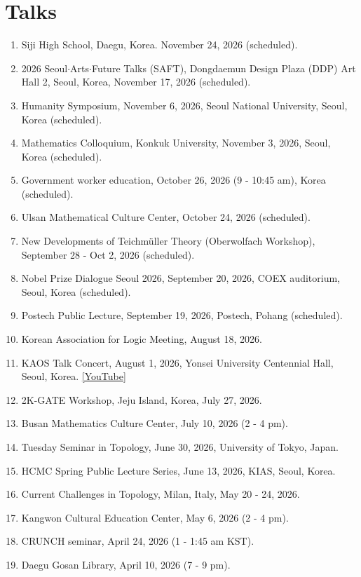 \documentclass[11pt,a4paper]{article}
\begin{document}
\section*{Talks}
\begin{enumerate}[leftmargin=1.5em, label=\arabic*.]
\item Siji High School, Daegu, Korea. November 24, 2026 (scheduled).
\item 2026 Seoul$\cdot$Arts$\cdot$Future Talks (SAFT), Dongdaemun Design Plaza (DDP) Art Hall 2, Seoul, Korea, November 17, 2026 (scheduled).
\item Humanity Symposium, November 6, 2026, Seoul National University, Seoul, Korea (scheduled).
\item Mathematics Colloquium, Konkuk University, November 3, 2026, Seoul, Korea (scheduled).
\item Government worker education, October 26, 2026 (9 - 10:45 am), Korea (scheduled).
\item Ulsan Mathematical Culture Center, October 24, 2026 (scheduled).
\item New Developments of Teichmüller Theory (Oberwolfach Workshop), September 28 - Oct 2, 2026 (scheduled).
\item Nobel Prize Dialogue Seoul 2026, September 20, 2026, COEX auditorium, Seoul, Korea (scheduled).
\item Postech Public Lecture, September 19, 2026, Postech, Pohang (scheduled).
\item Korean Association for Logic Meeting, August 18, 2026.
\item KAOS Talk Concert, August 1, 2026, Yonsei University Centennial Hall, Seoul, Korea. \href{https://youtu.be/NSLR6f_R9iA?si=Yl-nXGFkB4_IXiLs}{[YouTube]}
\item 2K-GATE Workshop, Jeju Island, Korea, July 27, 2026.
\item Busan Mathematics Culture Center, July 10, 2026 (2 - 4 pm).
\item Tuesday Seminar in Topology, June 30, 2026, University of Tokyo, Japan.
\item HCMC Spring Public Lecture Series, June 13, 2026, KIAS, Seoul, Korea.
\item Current Challenges in Topology, Milan, Italy, May 20 - 24, 2026.
\item Kangwon Cultural Education Center, May 6, 2026 (2 - 4 pm).
\item CRUNCH seminar, April 24, 2026 (1 - 1:45 am KST).
\item Daegu Gosan Library, April 10, 2026 (7 - 9 pm).

\end{enumerate}
\end{document}
